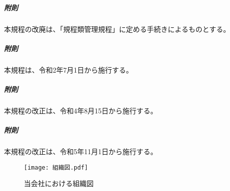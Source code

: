 \documentclass[10pt,a4paper,uplatex,dvipdfmx]{jsarticle}
\begin{document}
\vspace{1cm}
\subparagraph{附則}本規程の改廃は、「規程類管理規程」に定める手続きによるものとする。
\subparagraph{附則}本規程は、令和2年7月1日から施行する。
\subparagraph{附則}本規程の改正は、令和4年8月15日から施行する。 
\subparagraph{附則}本規程の改正は、令和5年11月1日から施行する。 

\clearpage

\begin{figure}[h]
\centering
	\texttt{[image: 組織図.pdf]}
\caption{当会社における組織図}
\label{fig:組織図}
\end{figure}
\end{document}
